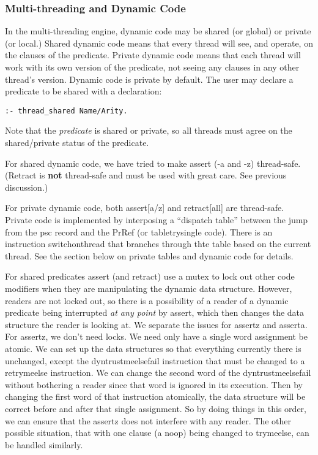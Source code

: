 \documentclass[11pt]{article}
\begin{document}
\subsubsection{Multi-threading and Dynamic Code}
In the multi-threading engine, dynamic code may be shared (or global)
or private (or local.)  Shared dynamic code means that every thread
will see, and operate, on the clauses of the predicate.  Private
dynamic code means that each thread will work with its own version of
the predicate, not seeing any clauses in any other thread's version.
Dynamic code is private by default.  The user may declare a predicate
to be shared with a declaration:
\begin{verbatim}
:- thread_shared Name/Arity.
\end{verbatim}
Note that the {\em predicate} is shared or private, so all threads
must agree on the shared/private status of the predicate.

For shared dynamic code, we have tried to make assert (-a and -z)
thread-safe.  (Retract is {\bf not} thread-safe and must be used with
great care.  See previous discussion.)

For private dynamic code, both assert[a/z] and retract[all] are
thread-safe.  Private code is implemented by interposing a ``dispatch
table'' between the jump from the psc record and the PrRef (or
tabletrysingle code).  There is an instruction switchonthread that
branches through thte table based on the current thread.  See the
section below on private tables and dynamic code for details.

For shared predicates assert (and retract) use a mutex to lock out
other code modifiers when they are manipulating the dynamic data
structure.  However, readers are not locked out, so there is a
possibility of a reader of a dynamic predicate being interrupted {\em
at any point} by assert, which then changes the data structure the
reader is looking at.  We separate the issues for assertz and asserta.
For assertz, we don't need locks.  We need only have a single word
assignment be atomic.  We can set up the data structures so that
everything currently there is unchanged, except the dyntrustmeelsefail
instruction that must be changed to a retrymeelse instruction.  We can
change the second word of the dyntrustmeelsefail without bothering a
reader since that word is ignored in its execution.  Then by changing
the first word of that instruction atomically, the data structure will
be correct before and after that single assignment.  So by doing
things in this order, we can ensure that the assertz does not
interfere with any reader.  The other possible situation, that with
one clause (a noop) being changed to trymeelse, can be handled
similarly.
\end{document}
